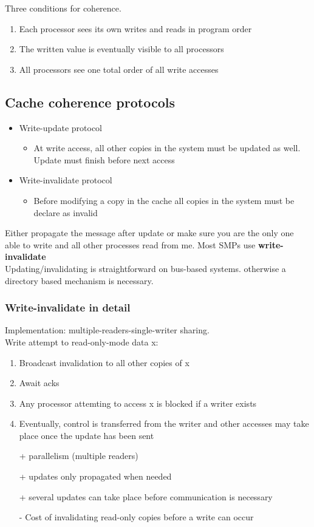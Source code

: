 \documentclass[a4paper]{article}
\begin{document}
Three conditions for coherence.
\begin{enumerate}
    \item Each processor sees its own writes and reads in program order
    \item The written value is eventually visible to all processors
    \item All processors see one total order of all write accesses
\end{enumerate}
\subsection{Cache coherence protocols}
\begin{itemize}
    \item Write-update protocol
        \begin{itemize}
            \item At write access, all other copies in the system must be
                updated as well. Update must finish before next access
        \end{itemize}
    \item Write-invalidate protocol
        \begin{itemize}
            \item Before modifying a copy in the cache all copies in the system
                must be declare as invalid
        \end{itemize}
\end{itemize}
Either propagate the message after update or make sure you are the only one
able to write and all other processes read from me. Most SMPs use \textbf{write-invalidate}
\\
Updating/invalidating is straightforward on bus-based systems. otherwise a directory
based mechanism is necessary.
\subsubsection{Write-invalidate in detail}
Implementation: multiple-readers-single-writer sharing.
\\Write attempt to read-only-mode data x:
\begin{enumerate}
    \item Broadcast invalidation to all other copies of x
    \item Await acks
    \item Any processor attemting to access x is blocked if a writer exists
    \item Eventually, control is transferred from the writer
        and other accesses may take place once the update has been sent
\end{enumerate}
\begin{itemize}
    \item[+] parallelism (multiple readers)
    \item[+] updates only propagated when needed
    \item[+] several updates can take place before communication is necessary
    \item[-] Cost of invalidating read-only copies before a write can occur
\end{itemize}
\end{document}
